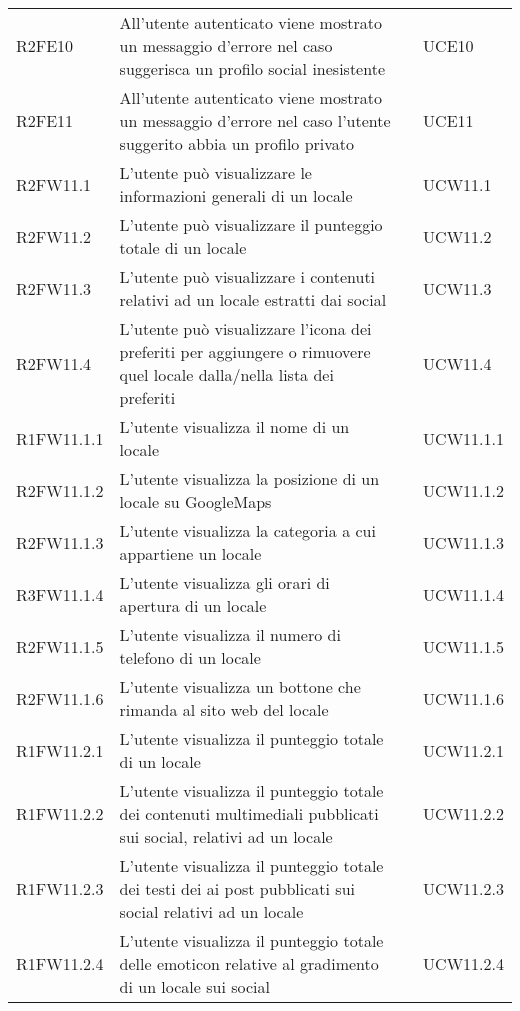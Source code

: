 \begin{longtable}{ m{}<{\centering}  m{}<{\centering}  m{}<{\centering}  m{}<{\centering}}
	R2FE10 & All’utente autenticato viene mostrato un messaggio d’errore nel caso suggerisca un profilo social inesistente & \De & UCE10\\		

	R2FE11 & All’utente autenticato viene mostrato un messaggio d’errore nel caso l’utente suggerito abbia un profilo privato & \De & UCE11\\
	
	R2FW11.1 & L’utente può visualizzare le informazioni generali di un locale & \De & UCW11.1 \\
	R2FW11.2 & L’utente può visualizzare il punteggio totale di un locale & \De & UCW11.2 \\
	R2FW11.3 & L’utente può visualizzare i contenuti relativi ad un locale estratti dai social & \De & UCW11.3 \\
	R2FW11.4 & L’utente può visualizzare l’icona dei preferiti per aggiungere o rimuovere quel locale dalla/nella lista dei preferiti & \De & UCW11.4 \\

	R1FW11.1.1 & L’utente visualizza il nome di un locale & \Ob & UCW11.1.1 \\
	R2FW11.1.2 & L’utente visualizza la posizione di un locale su GoogleMaps & \De & UCW11.1.2 \\
	R2FW11.1.3 & L’utente visualizza la categoria a cui appartiene un locale & \De & UCW11.1.3 \\
	R3FW11.1.4 & L’utente visualizza gli orari di apertura di un locale & \Fa & UCW11.1.4 \\
	R2FW11.1.5 & L’utente visualizza il numero di telefono di un locale & \De & UCW11.1.5 \\
	R2FW11.1.6 & L’utente visualizza un bottone che rimanda al sito web del locale & \De & UCW11.1.6 \\

	R1FW11.2.1 & L’utente visualizza il punteggio totale di un locale & \Ob & UCW11.2.1 \\
	R1FW11.2.2 & L’utente visualizza il punteggio totale dei contenuti multimediali pubblicati sui social, relativi ad un locale & \Ob & UCW11.2.2 \\
	R1FW11.2.3 & L’utente visualizza il punteggio totale dei testi dei ai post pubblicati sui social relativi ad un locale & \Ob & UCW11.2.3 \\
	R1FW11.2.4 & L’utente visualizza il punteggio totale delle emoticon relative al gradimento di un locale sui social & \Ob & UCW11.2.4 \\


\end{longtable}

